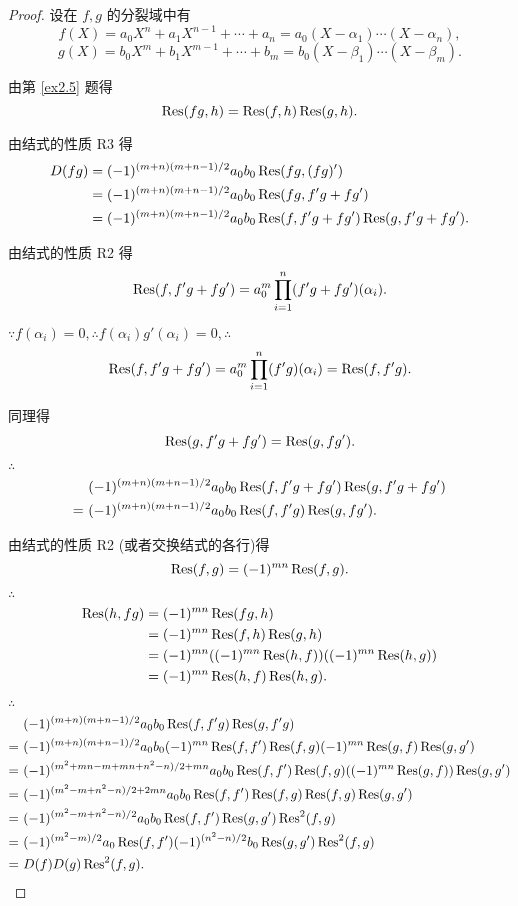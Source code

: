 \documentclass[color=black,device=normal,lang=cn,mode=geye]{elegantnote}
\begin{document}
\begin{proof}
    设在 $f,g$ 的分裂域中有
    \[f(X)=a_0X^n+a_1X^{n-1}+\cdots+a_n=a_0(X-\alpha_1)\cdots(X-\alpha_n),\]
    \[g(X)=b_0X^m+b_1X^{m-1}+\cdots+b_m=b_0(X-\beta_1)\cdots(X-\beta_m).\]

    由第 \ref{ex2.5} 题得
    \[\operatorname{Res} (fg,h)=\operatorname{Res} (f,h)\operatorname{Res} (g,h).\]

    由结式的性质 R3 得
    \begin{align*}
        D(fg) & =(-1)^{(m+n)(m+n-1)/2}a_0b_0\operatorname{Res} (fg,(fg)') \\
        & =(-1)^{(m+n)(m+n-1)/2}a_0b_0\operatorname{Res} (fg,f'g+fg') \\
        & =(-1)^{(m+n)(m+n-1)/2}a_0b_0\operatorname{Res} (f,f'g+fg')\operatorname{Res} (g,f'g+fg').
    \end{align*}

    由结式的性质 R2 得
    \[\operatorname{Res} (f,f'g+fg')=a_0^m\prod\limits_{i=1}^n(f'g+fg')(\alpha_i).\]

    $\because f(\alpha_i)=0,\therefore f(\alpha_i)g'(\alpha_i)=0,\therefore$
    \[\operatorname{Res} (f,f'g+fg')=a_0^m\prod\limits_{i=1}^n(f'g)(\alpha_i)=\operatorname{Res} (f,f'g).\]

    同理得
    \[\operatorname{Res} (g,f'g+fg')=\operatorname{Res} (g,fg').\]

    $\therefore$
    \begin{align*}
        & (-1)^{(m+n)(m+n-1)/2}a_0b_0\operatorname{Res} (f,f'g+fg')\operatorname{Res} (g,f'g+fg') \\
        =\  & (-1)^{(m+n)(m+n-1)/2}a_0b_0\operatorname{Res} (f,f'g)\operatorname{Res} (g,fg').
    \end{align*}

    由结式的性质 R2 (或者交换结式的各行)得
    \[\operatorname{Res} (f,g)=(-1)^{mn}\operatorname{Res} (f,g).\]

    $\therefore$
    \begin{align*}
        \operatorname{Res} (h,fg) & =(-1)^{mn}\operatorname{Res} (fg,h) \\
        & =(-1)^{mn}\operatorname{Res} (f,h)\operatorname{Res} (g,h) \\
        & =(-1)^{mn}((-1)^{mn}\operatorname{Res} (h,f))((-1)^{mn}\operatorname{Res} (h,g)) \\
        & =(-1)^{mn}\operatorname{Res} (h,f)\operatorname{Res} (h,g).
    \end{align*}

    $\therefore$
    \begin{align*}
        & (-1)^{(m+n)(m+n-1)/2}a_0b_0\operatorname{Res} (f,f'g)\operatorname{Res} (g,f'g) \\
        =\  & (-1)^{(m+n)(m+n-1)/2}a_0b_0(-1)^{mn}\operatorname{Res} (f,f')\operatorname{Res} (f,g)(-1)^{mn}\operatorname{Res} (g,f)\operatorname{Res} (g,g') \\
        =\  & (-1)^{(m^2+mn-m+mn+n^2-n)/2+mn}a_0b_0\operatorname{Res} (f,f')\operatorname{Res} (f,g)((-1)^{mn}\operatorname{Res} (g,f))\operatorname{Res} (g,g') \\
        =\  & (-1)^{(m^2-m+n^2-n)/2+2mn}a_0b_0\operatorname{Res} (f,f')\operatorname{Res} (f,g)\operatorname{Res} (f,g)\operatorname{Res} (g,g') \\
        =\  & (-1)^{(m^2-m+n^2-n)/2}a_0b_0\operatorname{Res} (f,f')\operatorname{Res} (g,g')\operatorname{Res} ^2(f,g) \\
        =\  & (-1)^{(m^2-m)/2}a_0\operatorname{Res} (f,f')(-1)^{(n^2-n)/2}b_0\operatorname{Res} (g,g')\operatorname{Res} ^2(f,g) \\
        =\  & D(f)D(g)\operatorname{Res} ^2(f,g).\qedhere
    \end{align*}
\end{proof}
\end{document}
